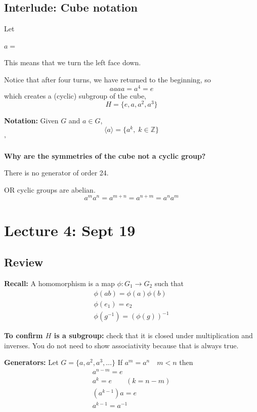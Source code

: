 \documentclass[12pt]{report}
\newcommand{\brak}[1]{\langle #1 \rangle}
\newcommand{\Z}{\mathbb{Z}}
\begin{document}
\subsection*{Interlude: Cube notation}
Let 
\begin{center}
    $ a = $ 
\end{center}

This means that we turn the left face down.

Notice that after four turns, we have returned to the beginning, so 
\[aaaa = a^4 = e\]
which creates a (cyclic) subgroup of the cube,
\[H = \{e, a, a^2, a^3\}\]

\textbf{Notation:} Given $G$ and $a \in G$, 
\[\brak{a} = \{a^k, \; k \in \Z\}\]'

\textbf{Why are the symmetries of the cube not a cyclic group?}

There is no generator of order 24. 

OR cyclic groups are abelian. 
\[a^m a^n = a^{m + n} = a^{n + m} = a^n a^m\]

\section*{Lecture 4: Sept 19}
\subsection*{Review}
\textbf{Recall:} A homomorphism is a map $\phi: G_1 \to G_2$ such that 
\begin{align*}
    \phi(ab) = \phi(a)\phi(b)\\
    \phi(e_1) = e_2\\
    \phi(g^{-1}) = (\phi(g))^{-1} 
\end{align*}

\textbf{To confirm $H$ is a subgroup:} check that it is closed under multiplication and inverses. You do not need to show associativity because that is always true. 

\textbf{Generators:}
Let $G = \{a, a^2, a^3, \dots\}$ If $a^m = a^n \quad m < n$ then 
\begin{align*}
    a^{n - m} = e\\
    a^k = e \qquad (k=n - m)\\
    (a^{k-1}) a = e\\
    a^{k-1} = a^{-1}
\end{align*}
\end{document}
